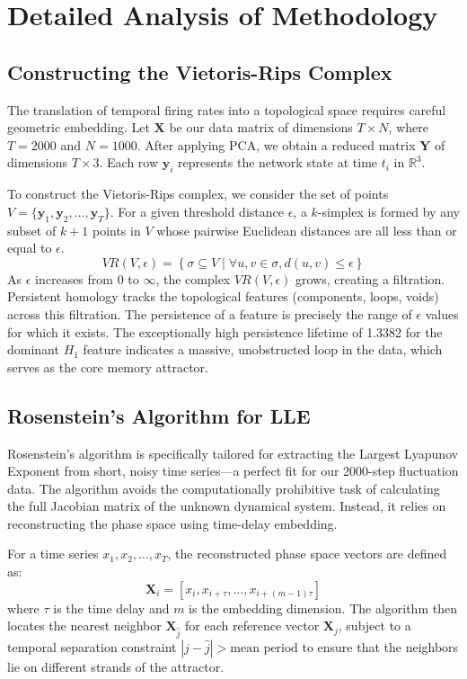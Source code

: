 \documentclass[11pt,a4paper]{article}
\begin{document}
\section{Detailed Analysis of Methodology}
\subsection{Constructing the Vietoris-Rips Complex}
The translation of temporal firing rates into a topological space requires careful geometric embedding. Let $\mathbf{X}$ be our data matrix of dimensions $T \times N$, where $T=2000$ and $N=1000$. After applying PCA, we obtain a reduced matrix $\mathbf{Y}$ of dimensions $T \times 3$. Each row $\mathbf{y}_i$ represents the network state at time $t_i$ in $\mathbb{R}^3$. 

To construct the Vietoris-Rips complex, we consider the set of points $V = \{\mathbf{y}_1, \mathbf{y}_2, \dots, \mathbf{y}_T\}$. For a given threshold distance $\epsilon$, a $k$-simplex is formed by any subset of $k+1$ points in $V$ whose pairwise Euclidean distances are all less than or equal to $\epsilon$. 
\begin{equation}
    VR(V, \epsilon) = \left\{ \sigma \subseteq V \mid \forall u, v \in \sigma, d(u, v) \leq \epsilon \right\}
\end{equation}
As $\epsilon$ increases from $0$ to $\infty$, the complex $VR(V, \epsilon)$ grows, creating a filtration. Persistent homology tracks the topological features (components, loops, voids) across this filtration. The persistence of a feature is precisely the range of $\epsilon$ values for which it exists. The exceptionally high persistence lifetime of 1.3382 for the dominant $H_1$ feature indicates a massive, unobstructed loop in the data, which serves as the core memory attractor.

\subsection{Rosenstein's Algorithm for LLE}
Rosenstein's algorithm is specifically tailored for extracting the Largest Lyapunov Exponent from short, noisy time series—a perfect fit for our 2000-step fluctuation data. The algorithm avoids the computationally prohibitive task of calculating the full Jacobian matrix of the unknown dynamical system. Instead, it relies on reconstructing the phase space using time-delay embedding.

For a time series $x_1, x_2, \dots, x_T$, the reconstructed phase space vectors are defined as:
\begin{equation}
    \mathbf{X}_i = [x_i, x_{i+\tau}, \dots, x_{i+(m-1)\tau}]
\end{equation}
where $\tau$ is the time delay and $m$ is the embedding dimension. The algorithm then locates the nearest neighbor $\mathbf{X}_{\hat{j}}$ for each reference vector $\mathbf{X}_j$, subject to a temporal separation constraint $|j - \hat{j}| > \text{mean period}$ to ensure that the neighbors lie on different strands of the attractor. 
\end{document}
